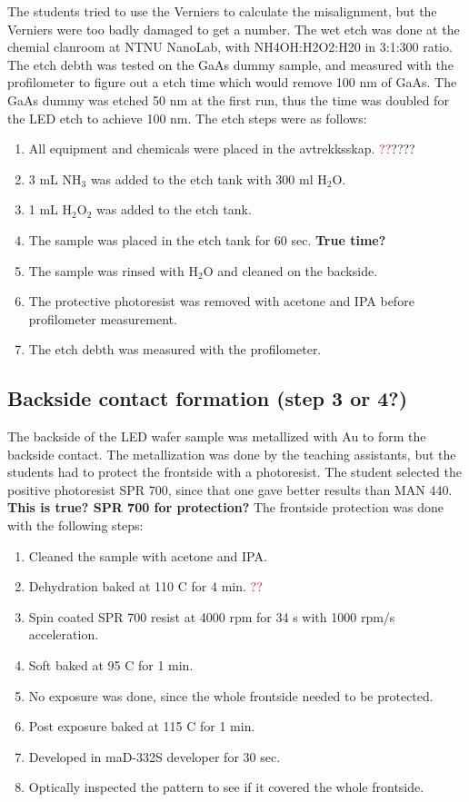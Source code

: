 The students tried to use the Verniers to calculate the misalignment, but the Verniers were too badly damaged to get a number.
The wet etch was done at the chemial clanroom at NTNU NanoLab, with NH4OH:H2O2:H20 in 3:1:300 ratio.
The etch debth was tested on the GaAs dummy sample, and measured with the profilometer to figure out a etch time which would remove 100 nm of GaAs.
The GaAs dummy was etched 50 nm at the first run, thus the time was doubled for the LED etch to achieve 100 nm.
The etch steps were as follows:

\begin{enumerate}
    \item All equipment and chemicals were placed in the avtrekksskap. \textcolor{red}{??}????
    \item 3 mL NH$_3$ was added to the etch tank with 300 ml H$_2$O.
    \item 1 mL H$_2$O$_2$ was added to the etch tank.
    \item The sample was placed in the etch tank for 60 sec. \textbf{True time?}
    \item The sample was rinsed with H$_2$O and cleaned on the backside.
    \item The protective photoresist was removed with acetone and IPA before profilometer measurement.
    \item The etch debth was measured with the profilometer.
\end{enumerate}



\subsection{Backside contact formation (step 3 or 4?)}
\label{methods:backside_metallization}
The backside of the LED wafer sample was metallized with Au to form the backside contact.
The metallization was done by the teaching assistants, but the students had to protect the frontside with a photoresist.
The student selected the positive photoresist SPR 700, since that one gave better results than MAN 440.
\textbf{This is true? SPR 700 for protection?}
The frontside protection was done with the following steps:
\begin{enumerate}
    \item Cleaned the sample with acetone and IPA.
    \item Dehydration baked at 110 \textdegree C for 4 min. \textcolor{red}{??}
    \item Spin coated SPR 700 resist at 4000 rpm for 34 s with 1000 rpm/s acceleration.
    \item Soft baked at 95 \textdegree C for 1 min.
    \item No exposure was done, since the whole frontside needed to be protected.
    \item Post exposure baked at 115 \textdegree C for 1 min.
    \item Developed in maD-332S developer for 30 sec.
    \item Optically inspected the pattern to see if it covered the whole frontside.
\end{enumerate}


